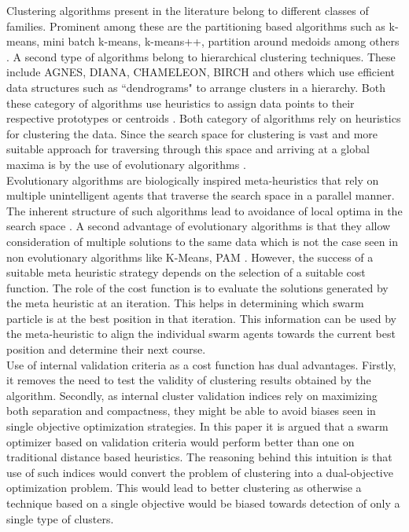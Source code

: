 \documentclass{svproc}
\begin{document}
Clustering algorithms present in the literature belong to different classes of families. Prominent among these are the partitioning based algorithms such as k-means, mini batch k-means, k-means++, partition around medoids among others \cite{ppr:4}. A second type of algorithms belong to hierarchical clustering techniques. These include AGNES, DIANA, CHAMELEON, BIRCH and others which use efficient data structures such as ``dendrograms" to arrange clusters in a hierarchy. Both these category of algorithms use heuristics to assign data points to their respective prototypes or centroids \cite{ppr:5}. Both category of algorithms rely on heuristics for clustering the data. Since the search space for clustering is vast and more suitable approach for traversing through this space and arriving at a global maxima is by the use of evolutionary algorithms \cite{ppr:6}.\\    

Evolutionary algorithms are biologically inspired meta-heuristics that rely on multiple unintelligent agents that traverse the search space in a parallel manner. The inherent structure of such algorithms lead to avoidance of local optima in the search space \cite{ppr:6}. A second advantage of evolutionary algorithms is that they allow consideration of multiple solutions to the same data which is not the case seen in non evolutionary algorithms like K-Means, PAM \cite{ppr:7}. However, the success of a suitable meta heuristic strategy depends on the selection of a suitable cost function. The role of the cost function is to evaluate the solutions generated by the meta heuristic at an iteration. This helps in determining which swarm particle is at the best position in that iteration. This information can be used by the meta-heuristic to align the individual swarm agents towards the current best position and determine their next course.\\

Use of internal validation criteria as a cost function has dual advantages. Firstly, it removes the need to test the validity of clustering results obtained by the algorithm. Secondly, as internal cluster validation indices rely on maximizing both separation and compactness, they might be able to avoid biases seen in single objective optimization strategies.  In this paper it is argued that a swarm optimizer based on validation criteria would perform better than one on traditional distance based heuristics. The reasoning behind this intuition is that use of such indices would convert the problem of clustering into a dual-objective optimization problem. This would lead to better clustering as otherwise a technique based on a single objective would be biased towards detection of only a single type of clusters.\\
\end{document}
